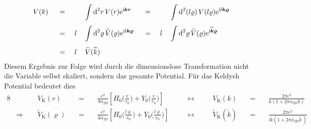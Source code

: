 \documentclass[a4paper,11pt, twoside]{article}
\newcommand{\+}{\dagger}
\renewcommand{\'}{\tt\textquotesingle}
\renewcommand{\exp}[1]{\tt{e}^{#1}}
\renewcommand{\^}{\hat}
\renewcommand{\tt}{\text}
\renewcommand{\~}{\widetilde}
\begin{document}
\begin{alignat*}{8}
& V(k) && \ = \ && && \int \tt d^2 r \,  V(r)  \exp{\tt i\bm k \bm r} 
 && \ = \ && &&\int \tt d^2 (l\varrho) \,  V(l\varrho)  \exp{\tt i l \bm k \bm \varrho} \\[4pt]
& && \ = \ && l &&\int \tt d^2 \varrho \,  \~V(\varrho)  \exp{\tt i l \bm k \bm \varrho} 
 && \ = \ && l &&\int \tt d^2 \varrho \,  \~V(\varrho)  \exp{\tt i \~{\bm k} \bm \varrho} \\[4pt]
& && \ = \ && l &&\,\~V(\~ k) 
\end{alignat*}
Diesem Ergebnis zur Folge wird durch die dimensionslose Transformation nicht die Variable selbst skaliert, sondern das gesamte Potential. Für das Keldysh Potential bedeutet dies 
\begin{alignat*}{8}
& && V_\tt{K}(r) &&\ = \ && \frac{e^2}{4\alpha_\tt{2D}}\left [H_0\Big(\frac{r}{r_0}\Big)+Y_0\Big(\frac{r}{r_0}\Big)\right ] 
&&\quad \leftrightarrow\quad &&
V_\tt{K}(k) &&\ = \ && \frac{2\pi e^2}{k(1+2\pi\alpha_\tt{2D}k)} \\[5pt]
& \Rightarrow\ \ && \~V_\tt{K}(\varrho) &&\ = \ && \frac{e^2}{4\alpha_\tt{2D}}\left [H_0\Big(\frac{l\varrho}{r_0}\Big)+Y_0\Big(\frac{l\varrho}{r_0}\Big)\right ] 
&&\quad \leftrightarrow\quad &&
\~V_\tt{K}(\~k) &&\ = \ && \frac{2\pi e^2}{l\~ k(1+2\pi\alpha_\tt{2D}\~ k\,)} 
\end{alignat*}
\newpage
\end{document}
